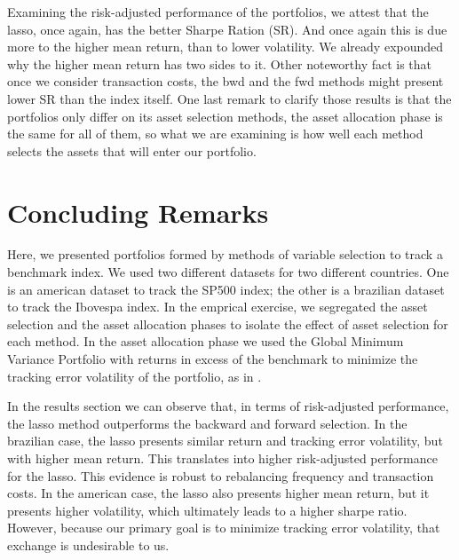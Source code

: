 \documentclass[preprint,authoryear,review,12pt]{elsarticle}
\begin{document}
Examining the risk-adjusted performance of the portfolios, we attest that the lasso, once again, has the better Sharpe Ration (SR).
And once again this is due more to the higher mean return, than to lower volatility.
We already expounded why the higher mean return has two sides to it.
Other noteworthy fact is that once we consider transaction costs, the bwd and the fwd methods might present lower SR than the index itself.
One last remark to clarify those results is that the portfolios only differ on its asset selection methods, the asset allocation phase is the same for all of them, so what we are examining is how well each method selects the assets that will enter our portfolio.

% 
% 
% 
% 
% 

\section{Concluding Remarks} \label{sec:conc}

Here, we presented portfolios formed by methods of variable selection to track a benchmark index.
We used two different datasets for two different countries.
One is an american dataset to track the SP500 index; the other is a brazilian dataset to track the Ibovespa index.
In the emprical exercise, we segregated the asset selection and the asset allocation phases to isolate the effect of asset selection for each method.
In the asset allocation phase we used the Global Minimum Variance Portfolio with returns in excess of the benchmark to minimize the tracking error volatility of the portfolio, as in \cite{liu-2009}.

In the results section we can observe that, in terms of risk-adjusted performance, the lasso method outperforms the backward and forward selection. 
In the brazilian case, the lasso presents similar return and tracking error volatility, but with higher mean return.
This translates into higher risk-adjusted performance for the lasso.
This evidence is robust to rebalancing frequency and transaction costs.
In the american case, the lasso also presents higher mean return, but it presents higher volatility, which ultimately leads to a higher sharpe ratio.
However, because our primary goal is to minimize tracking error volatility, that exchange is undesirable to us.
\end{document}
